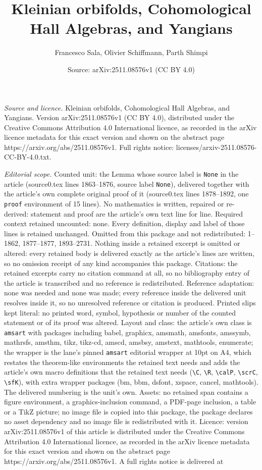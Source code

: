 \documentclass[10pt,a4paper]{amsart}
\title[Kleinian orbifolds, Cohomological Hall Algebras, and Yangian]{Kleinian orbifolds, Cohomological Hall Algebras, and Yangians}
\author{Francesco Sala, Olivier Schiffmann, Parth Shimpi}
\date{Source: arXiv:2511.08576v1 (CC BY 4.0)}
\begin{document}
\maketitle

\noindent\emph{Source and licence.} Kleinian orbifolds, Cohomological Hall Algebras, and Yangians. Version arXiv:2511.08576v1 (CC BY 4.0), distributed under the Creative Commons Attribution 4.0 International licence, as recorded in the arXiv licence metadata for this exact version and shown on the abstract page https://arxiv.org/abs/2511.08576v1. Full rights notice: licenses/arxiv-2511.08576-CC-BY-4.0.txt.\par\smallskip

\noindent\textit{Editorial scope.} Counted unit: the Lemma whose source label is \texttt{None} in the article (source0.tex lines 1863--1876, source label \texttt{None}), delivered together with the article's own complete original proof of it (source0.tex lines 1878--1892, one \texttt{proof} environment of 15 lines). No mathematics is written, repaired or re-derived: statement and proof are the article's own text line for line. Required context retained uncounted: none. Every definition, display and label of those lines is retained unchanged. Omitted from this package and not redistributed: 1--1862, 1877--1877, 1893--2731. Nothing inside a retained excerpt is omitted or altered: every retained body is delivered exactly as the article's lines are written, so no omission receipt of any kind accompanies this package. Citations: the retained excerpts carry no citation command at all, so no bibliography entry of the article is transcribed and no reference is redistributed. Reference adaptation: none was needed and none was made; every reference inside the delivered unit resolves inside it, so no unresolved reference or citation is produced. Printed slips kept literal: no printed word, symbol, hypothesis or number of the counted statement or of its proof was altered. Layout and class: the article's own class is \texttt{amsart} with packages including babel, graphicx, amsmath, amsfonts, amssymb, mathrsfs, amsthm, tikz, tikz-cd, amscd, amsbsy, amstext, mathtools, enumerate; the wrapper is the lane's pinned \texttt{amsart} editorial wrapper at 10pt on A4, which restates the theorem-like environments the retained text needs and adds the article's own macro definitions that the retained text needs (\texttt{\textbackslash C}, \texttt{\textbackslash R}, \texttt{\textbackslash calP}, \texttt{\textbackslash scrC}, \texttt{\textbackslash sfK}), with extra wrapper packages (bm, bbm, dsfont, xspace, cancel, mathtools). The delivered numbering is the unit's own. Assets: no retained span contains a figure environment, a graphics-inclusion command, a PDF-page inclusion, a table or a TikZ picture; no image file is copied into this package, the package declares no asset dependency and no image file is redistributed with it. Licence: version arXiv:2511.08576v1 of this article is distributed under the Creative Commons Attribution 4.0 International licence, as recorded in the arXiv licence metadata for this exact version and shown on the abstract page https://arxiv.org/abs/2511.08576v1. A full rights notice is delivered at 
\end{document}
